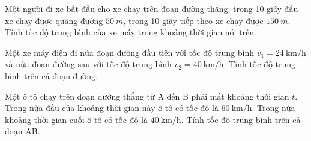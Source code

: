 \begin{ex}
	Một người đi xe bắt đầu cho xe chạy trên đoạn đường thẳng: trong 10 giây đầu xe chạy được quãng đường $\SI{50}{m}$, trong 10 giây tiếp theo xe chạy được $\SI{150}{m}$. Tính tốc độ trung bình của xe máy trong khoảng thời gian nói trên.
\end{ex}

\begin{ex}
	Một xe máy điện đi nửa đoạn đường đầu tiên với tốc độ trung bình $v_1 = \SI{24}{\kilo\meter/\hour}$ và nửa đoạn đường sau với tốc độ trung bình $v_2 = \SI{40}{\kilo\meter/\hour}$. Tính tốc độ trung bình trên cả đoạn đường.
\end{ex}

\begin{ex}
	Một ô tô chạy trên đoạn đường thẳng từ A đến B phải mất khoảng thời gian $t$. Trong nửa đầu của khoảng thời gian này ô tô có tốc độ là $\SI{60}{\kilo\meter/\hour}$. Trong nửa khoảng thời gian cuối ô tô có tốc độ là $\SI{40}{\kilo\meter/\hour}$. Tính tốc độ trung bình trên cả đoạn AB.
\end{ex}

